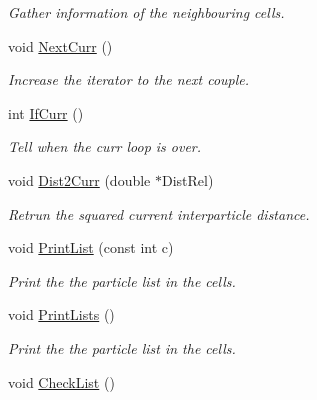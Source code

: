 \begin{DoxyCompactItemize}
\begin{DoxyCompactList}\small\item\em \-Gather information of the neighbouring cells. \end{DoxyCompactList}\item 
\hypertarget{classDdDoubleLoop_a42eeb7049c078ca89057fbc08726eded}{void \hyperlink{classDdDoubleLoop_a42eeb7049c078ca89057fbc08726eded}{\-Next\-Curr} ()}\label{classDdDoubleLoop_a42eeb7049c078ca89057fbc08726eded}

\begin{DoxyCompactList}\small\item\em \-Increase the iterator to the next couple. \end{DoxyCompactList}\item 
\hypertarget{classDdDoubleLoop_a63c5d18d3a487d1a8ab2a5881c6acb38}{int \hyperlink{classDdDoubleLoop_a63c5d18d3a487d1a8ab2a5881c6acb38}{\-If\-Curr} ()}\label{classDdDoubleLoop_a63c5d18d3a487d1a8ab2a5881c6acb38}

\begin{DoxyCompactList}\small\item\em \-Tell when the curr loop is over. \end{DoxyCompactList}\item 
void \hyperlink{classDdDoubleLoop_ad4860e7b4a26d4b424e5c98b7c6bae09}{\-Dist2\-Curr} (double $\ast$\-Dist\-Rel)
\begin{DoxyCompactList}\small\item\em \-Retrun the squared current interparticle distance. \end{DoxyCompactList}\item 
\hypertarget{classDdDoubleLoop_abacbda4ce7eed0eee33efe489157ff81}{void \hyperlink{classDdDoubleLoop_abacbda4ce7eed0eee33efe489157ff81}{\-Print\-List} (const int c)}\label{classDdDoubleLoop_abacbda4ce7eed0eee33efe489157ff81}

\begin{DoxyCompactList}\small\item\em \-Print the the particle list in the cells. \end{DoxyCompactList}\item 
\hypertarget{classDdDoubleLoop_aff89725be8d743f07f318ef0c06858e1}{void \hyperlink{classDdDoubleLoop_aff89725be8d743f07f318ef0c06858e1}{\-Print\-Lists} ()}\label{classDdDoubleLoop_aff89725be8d743f07f318ef0c06858e1}

\begin{DoxyCompactList}\small\item\em \-Print the the particle list in the cells. \end{DoxyCompactList}\item 
\hypertarget{classDdDoubleLoop_a4e589206ab9bc4752d547111d6bba6e7}{void \hyperlink{classDdDoubleLoop_a4e589206ab9bc4752d547111d6bba6e7}{\-Check\-List} ()}\label{classDdDoubleLoop_a4e589206ab9bc4752d547111d6bba6e7}


\end{DoxyCompactItemize}
